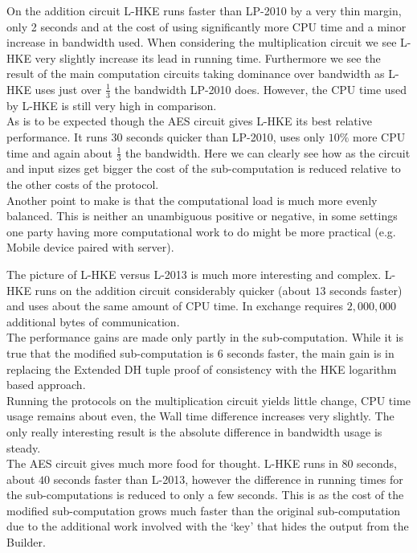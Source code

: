\documentclass[ %
                    author={Nicholas Tutte},
                supervisor={Prof. Nigel Smart},
                    degree={MEng},
                     title={Secure Two Party Computation},
                  subtitle={A practical comparison of recent protocols},
                      type={Research - GG1K},
                      year={2015} ]{dissertation}
\begin{document}
					On the addition circuit L-HKE runs faster than LP-2010 by a very thin margin, only 2 seconds and at the cost of using significantly more CPU time and a minor increase in bandwidth used. When considering the multiplication circuit we see L-HKE very slightly increase its lead in running time. Furthermore we see the result of the main computation circuits taking dominance over bandwidth as L-HKE uses just over $\frac{1}{3}$ the bandwidth LP-2010 does. However, the CPU time used by L-HKE is still very high in comparison.\\

					As is to be expected though the AES circuit gives L-HKE its best relative performance. It runs $30$ seconds quicker than LP-2010, uses only $10\%$ more CPU time and again about $\frac{1}{3}$ the bandwidth. Here we can clearly see how as the circuit and input sizes get bigger the cost of the sub-computation is reduced relative to the other costs of the protocol.\\

					Another point to make is that the computational load is much more evenly balanced. This is neither an unambiguous positive or negative, in some settings one party having more computational work to do might be more practical (e.g. Mobile device paired with server).\ 

					The picture of L-HKE versus L-2013 is much more interesting and complex. L-HKE runs on the addition circuit considerably quicker (about $13$ seconds faster) and uses about the same amount of CPU time. In exchange requires $2,000,000$ additional bytes of communication.\\

					The performance gains are made only partly in the sub-computation. While it is true that the modified sub-computation is $6$ seconds faster, the main gain is in replacing the Extended DH tuple proof of consistency with the HKE logarithm based approach.\\

					Running the protocols on the multiplication circuit yields little change, CPU time usage remains about even, the Wall time difference increases very slightly. The only really interesting result is the absolute difference in bandwidth usage is steady.\\

					The AES circuit gives much more food for thought. L-HKE runs in $80$ seconds, about $40$ seconds faster than L-2013, however the difference in running times for the sub-computations is reduced to only a few seconds. This is as the cost of the modified sub-computation grows much faster than the original sub-computation due to the additional work involved with the `key' that hides the output from the Builder.\\
\end{document}
